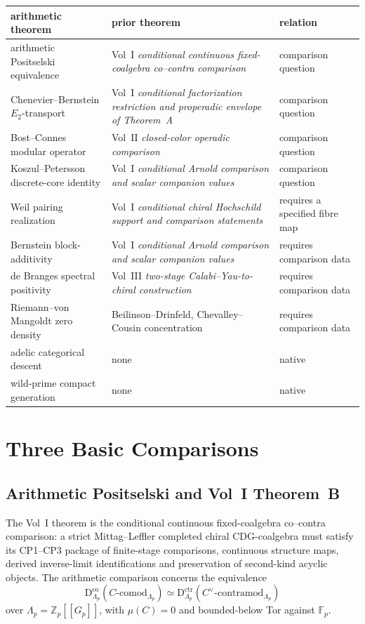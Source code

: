 \begin{center}
\small
\begin{tabular}{p{}|p{}|p{}}
arithmetic theorem & prior theorem & relation \\
\hline
arithmetic Positselski equivalence &
Vol~I \emph{conditional continuous fixed-coalgebra co--contra comparison} &
comparison question \\
Chenevier--Bernstein \(E_{2}\)-transport &
Vol~I \emph{conditional factorization restriction and properadic envelope of Theorem~A} &
comparison question \\
Bost--Connes modular operator &
Vol~II \emph{closed-color operadic comparison} &
comparison question \\
Koszul--Petersson discrete-core identity &
Vol~I \emph{conditional Arnold comparison and scalar companion values} &
comparison question \\
Weil pairing realization &
Vol~I \emph{conditional chiral Hochschild support and comparison statements} &
requires a specified fibre map \\
Bernstein block-additivity &
Vol~I \emph{conditional Arnold comparison and scalar companion values} &
requires comparison data \\
de Branges spectral positivity &
Vol~III \emph{two-stage Calabi--Yau-to-chiral construction} &
requires comparison data \\
Riemann--von Mangoldt zero density &
Beilinson--Drinfeld, Chevalley--Cousin concentration &
requires comparison data \\
adelic categorical descent &
none & native \\
wild-prime compact generation &
none & native
\end{tabular}
\end{center}

\section{Three Basic Comparisons}
\label{v4-arith:w6-i:strengthenings}

\subsection{Arithmetic Positselski and Vol~I Theorem~B}
\label{v4-arith:w6-i:W5-D-alignment}

The Vol~I theorem is the conditional continuous fixed-coalgebra
co--contra comparison: a strict Mittag--Leffler completed chiral
CDG-coalgebra must satisfy its CP1--CP3 package of finite-stage
comparisons, continuous structure maps, derived inverse-limit
identifications and preservation of second-kind acyclic objects.
The arithmetic comparison concerns the equivalence
\[
\mathrm{D}^{\mathrm{co}}_{\Lambda_{p}}(C\text{-comod}_{\Lambda_{p}})
\simeq
\mathrm{D}^{\mathrm{ctr}}_{\Lambda_{p}}(C^{\vee}\text{-contramod}_{\Lambda_{p}})
\]
over \(\Lambda_{p}=\mathbb Z_p[[G_p]]\), with \(\mu(C)=0\) and
bounded-below Tor against \(\mathbb F_p\).

